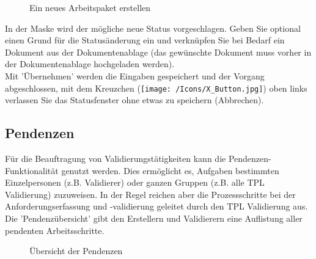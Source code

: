 \begin{figure}[H]
\caption{Ein neues Arbeitspaket erstellen}
\end{figure}

In der Maske wird der mögliche neue Status vorgeschlagen. Geben Sie optional einen Grund für die Statusänderung ein und verknüpfen Sie bei Bedarf ein Dokument aus der Dokumentenablage (das gewünschte Dokument muss vorher in der Dokumentenablage hochgeladen werden).\\
Mit 'Übernehmen' werden die Eingaben gespeichert und der Vorgang abgeschlossen, mit dem Kreuzchen (\texttt{[image: /Icons/X\_Button.jpg]}) oben links verlassen Sie das Statusfenster ohne etwas zu speichern (Abbrechen).

\subsection{Pendenzen}

Für die Beauftragung von Validierungstätigkeiten kann die Pendenzen-Funktionalität genutzt werden. Dies ermöglicht es, Aufgaben bestimmten Einzelpersonen (z.B. Validierer) oder ganzen Gruppen (z.B. alle TPL Validierung) zuzuweisen. In der Regel reichen aber die Prozessschritte bei der Anforderungserfassung und -validierung geleitet durch den TPL Validierung aus. Die 'Pendenzübersicht' gibt den Erstellern und Validierern eine Auflistung aller pendenten Arbeitsschritte. 

\begin{figure}[H]
\caption{Übersicht der Pendenzen}
\end{figure}

